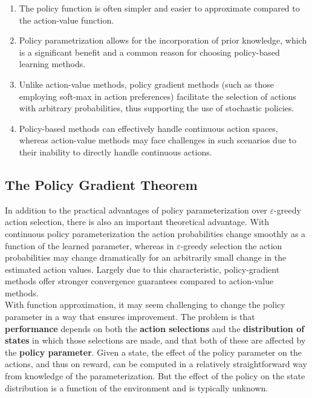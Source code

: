 {\begin{enumerate}
\item The policy function is often simpler and easier to approximate compared to the action-value function.
\item Policy parametrization allows for the incorporation of prior knowledge, which is a significant benefit and a common reason for choosing policy-based learning methods.
\item Unlike action-value methods, policy gradient methods (such as those employing soft-max in action preferences) facilitate the selection of actions with arbitrary probabilities, thus supporting the use of stochastic policies.
\item Policy-based methods can effectively handle continuous action spaces, whereas action-value methods may face challenges in such scenarios due to their inability to directly handle continuous actions.
\end{enumerate}

\subsection{The Policy Gradient Theorem}
In addition to the practical advantages of policy parameterization over $\varepsilon$-greedy action selection, there is also an important theoretical advantage. With continuous policy
parameterization the action probabilities change smoothly as a function of the learned
parameter, whereas in $\varepsilon$-greedy selection the action probabilities may change dramatically for an arbitrarily small change in the estimated action values.
Largely due to this characteristic, policy-gradient methods offer stronger convergence guarantees compared to action-value methods.\\

With function approximation, it may seem challenging to change the policy parameter in a way that ensures improvement. The problem is that \textbf{performance} depends on both the \textbf{action selections} and the \textbf{distribution of states} in which those selections are made, and that both of these are affected by the \textbf{policy parameter}. Given a state, the effect of the policy parameter on the actions, and thus on reward, can be computed in a relatively straightforward way from knowledge of the parameterization. But the effect of the policy on the state distribution is a function of the environment and is typically unknown. 

}
